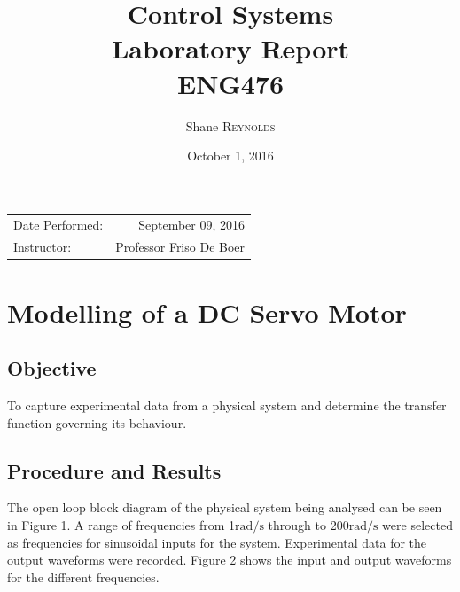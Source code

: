 \documentclass{article}
\title{Control Systems \\ Laboratory Report \\ ENG476} %
\author{Shane \textsc{Reynolds}} %
\date{October 1, 2016} %
\begin{document}
\maketitle %

\begin{center}
\begin{tabular}{l r}
Date Performed: & September 09, 2016 \\ %
Instructor: & Professor Friso De Boer %
\end{tabular}
\end{center}


\tableofcontents
\newpage

\section{Modelling of a DC Servo Motor}


\subsection{Objective}

To capture experimental data from a physical system and determine the transfer function governing its behaviour.
 

\subsection{Procedure and Results}

The open loop block diagram of the physical system being analysed can be seen in Figure 1. A range of frequencies from 1$\si{\radian\per\second}$ through to 200$\si{\radian\per\second}$ were selected as frequencies for sinusoidal inputs for the system. Experimental data for the output waveforms were recorded. Figure 2 shows the input and output waveforms for the different frequencies.
\end{document}
